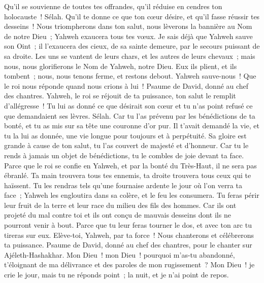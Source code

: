\begin{multicols}{2}
Qu'il se souvienne de toutes tes offrandes, qu'il réduise en cendres ton holocauste~! Sélah.
Qu'il te donne ce que ton cœur désire, et qu'il fasse réussir tes desseins~!
Nous triompherons dans ton salut, nous lèverons la bannière au Nom de notre Dieu~; Yahweh exaucera tous tes vœux.
Je sais déjà que Yahweh sauve son Oint~; il l'exaucera des cieux, de sa sainte demeure, par le secours puissant de sa droite.
Les uns se vantent de leurs chars, et les autres de leurs chevaux~; mais nous, nous glorifierons le Nom de Yahweh, notre Dieu.
Eux ils plient, et ils tombent~; nous, nous tenons ferme, et restons debout.
Yahweh sauve-nous~! Que le roi nous réponde quand nous crions à lui~!
\VerseOne{}Psaume de David, donné au chef des chantres.
Yahweh, le roi se réjouit de ta puissance, ton salut le remplit d'allégresse~!
Tu lui as donné ce que désirait son cœur et tu n'as point refusé ce que demandaient ses lèvres. Sélah.
Car tu l'as prévenu par les bénédictions de ta bonté, et tu as mis sur sa tête une couronne d'or pur.
Il t'avait demandé la vie, et tu la lui as donnée, une vie longue pour toujours et à perpétuité.
Sa gloire est grande à cause de ton salut, tu l'as couvert de majesté et d'honneur.
Car tu le rends à jamais un objet de bénédictions, tu le combles de joie devant ta face.
Parce que le roi se confie en Yahweh, et par la bonté du Très-Haut, il ne sera pas ébranlé.
Ta main trouvera tous tes ennemis, ta droite trouvera tous ceux qui te haïssent.
Tu les rendras tels qu'une fournaise ardente le jour où l'on verra ta face~; Yahweh les engloutira dans sa colère, et le feu les consumera.
Tu feras périr leur fruit de la terre et leur race du milieu des fils des hommes.
Car ils ont projeté du mal contre toi et ils ont conçu de mauvais desseins dont ils ne pourront venir à bout.
Parce que tu leur feras tourner le dos, et avec ton arc tu tireras sur eux.
Elève-toi, Yahweh, par ta force~! Nous chanterons et célébrerons ta puissance.
\VerseOne{}Psaume de David, donné au chef des chantres, pour le chanter sur Ajéleth-Hashakhar.
Mon Dieu~! mon Dieu~! pourquoi m'as-tu abandonné, t'éloignant de ma délivrance et des paroles de mon rugissement~?
Mon Dieu~! je crie le jour, mais tu ne réponds point~; la nuit, et je n'ai point de repos.

\end{multicols}
